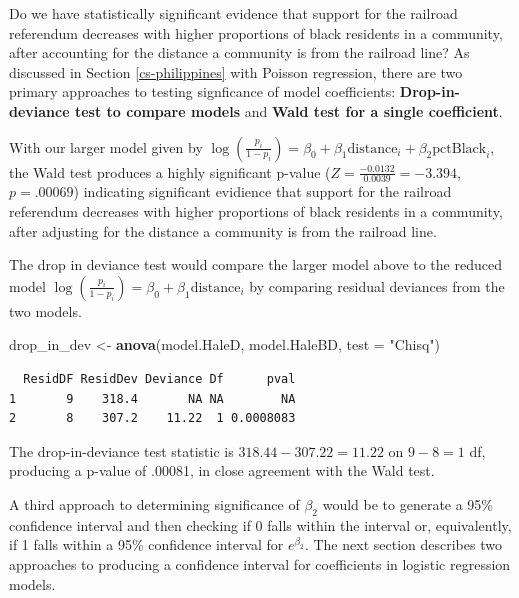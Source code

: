 \documentclass[
]{krantz}
\newenvironment{Shaded}{\begin{snugshade}}{\end{snugshade}}
\newcommand{\DataTypeTok}[1]{\textcolor[rgb]{0.27,0.27,0.27}{#1}}
\newcommand{\KeywordTok}[1]{\textcolor[rgb]{0.27,0.27,0.27}{\textbf{#1}}}
\newcommand{\NormalTok}[1]{#1}
\newcommand{\StringTok}[1]{\textcolor[rgb]{0.5,0.5,0.5}{#1}}
\begin{document}
Do we have statistically significant evidence that support for the railroad referendum decreases with higher proportions of black residents in a community, after accounting for the distance a community is from the railroad line? As discussed in Section \ref{cs-philippines} with Poisson regression, there are two primary approaches to testing signficance of model coefficients: \textbf{Drop-in-deviance test to compare models}  and \textbf{Wald test for a single coefficient}. 

With our larger model given by \(\log\left(\frac{p_i}{1-p_i}\right) = \beta_0+\beta_1\textrm{distance}_i+\beta_2\textrm{pctBlack}_i\), the Wald test produces a highly significant p-value (\(Z=\frac{-0.0132}{0.0039}= -3.394\), \(p=.00069\)) indicating significant evidience that support for the railroad referendum decreases with higher proportions of black residents in a community, after adjusting for the distance a community is from the railroad line.

The drop in deviance test would compare the larger model above to the reduced model \(\log\left(\frac{p_i}{1-p_i}\right) = \beta_0+\beta_1\textrm{distance}_i\) by comparing residual deviances from the two models.

\begin{Shaded}
\begin{Highlighting}[]
\NormalTok{drop_in_dev <-}\StringTok{ }\KeywordTok{anova}\NormalTok{(model.HaleD, model.HaleBD, }\DataTypeTok{test =} \StringTok{"Chisq"}\NormalTok{)}
\end{Highlighting}
\end{Shaded}

\begin{verbatim}
  ResidDF ResidDev Deviance Df      pval
1       9    318.4       NA NA        NA
2       8    307.2    11.22  1 0.0008083
\end{verbatim}

The drop-in-deviance test statistic is \(318.44 - 307.22 = 11.22\) on \(9 - 8 = 1\) df, producing a p-value of .00081, in close agreement with the Wald test.

A third approach to determining significance of \(\beta_2\) would be to generate a 95\% confidence interval and then checking if 0 falls within the interval or, equivalently, if 1 falls within a 95\% confidence interval for \(e^{\beta_2}.\) The next section describes two approaches to producing a confidence interval for coefficients in logistic regression models.
\end{document}
